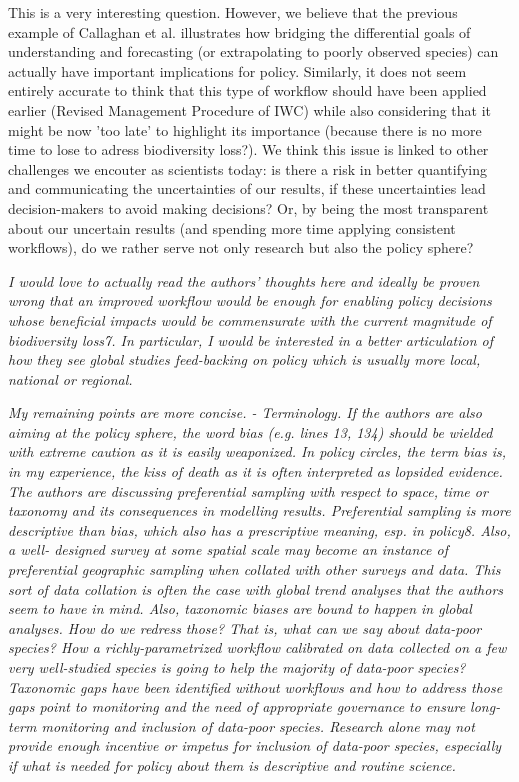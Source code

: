 \documentclass[11pt,letter]{article}
\begin{document}
This is a very interesting question. However, we believe that the previous example of Callaghan et al. illustrates how bridging the differential goals of understanding and forecasting (or extrapolating to poorly observed species) can actually have important implications for policy. Similarly, it does not seem entirely accurate to think that this type of workflow should have been applied earlier (Revised Management Procedure of IWC) while also considering that it might be now 'too late' to highlight its importance (because there is no more time to lose to adress biodiversity loss?). We think this issue is linked to other challenges we encouter as scientists today: is there a risk in better quantifying and communicating the uncertainties of our results, if these uncertainties lead decision-makers to avoid making decisions? Or, by being the most transparent about our uncertain results (and spending more time applying consistent workflows), do we rather serve not only research but also the policy sphere?




\begin{mybox}
\emph{I would love to actually read the authors’ thoughts here and ideally be proven wrong that an
improved workflow would be enough for enabling policy decisions whose beneficial impacts
would be commensurate with the current magnitude of biodiversity loss7. In particular, I
would be interested in a better articulation of how they see global studies feed-backing on
policy which is usually more local, national or regional.}  
\end{mybox}

\begin{mybox}
\emph{My remaining points are more concise.
- Terminology. If the authors are also aiming at the policy sphere, the word bias (e.g. lines
13, 134) should be wielded with extreme caution as it is easily weaponized. In policy
circles, the term bias is, in my experience, the kiss of death as it is often interpreted as
lopsided evidence. The authors are discussing preferential sampling with respect to space,
time or taxonomy and its consequences in modelling results. Preferential sampling is more
descriptive than bias, which also has a prescriptive meaning, esp. in policy8. Also, a well-
designed survey at some spatial scale may become an instance of preferential geographic
sampling when collated with other surveys and data. This sort of data collation is often the
case with global trend analyses that the authors seem to have in mind. Also, taxonomic
biases are bound to happen in global analyses. How do we redress those? That is, what can
we say about data-poor species? How a richly-parametrized workflow calibrated on data
collected on a few very well-studied species is going to help the majority of data-poor
species? Taxonomic gaps have been identified without workflows and how to address
those gaps point to monitoring and the need of appropriate governance to ensure long-
term monitoring and inclusion of data-poor species. Research alone may not provide
enough incentive or impetus for inclusion of data-poor species, especially if what is
needed for policy about them is descriptive and routine science.}  
\end{mybox}
\end{document}
